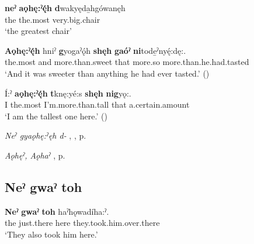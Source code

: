 \ea
\label{ex:npar11}
\gll \textbf{neˀ} \textbf{aǫhę:ˀę́h} \textbf{d}wakyęda̱hgówanęh\\
the the.most very.big.chair\\
\glt ‘the greatest chair’
\z

\ea
\label{ex:npar12}
\gll \textbf{Aǫhę:ˀę́h} hniˀ \textbf{g}yogaˀǫ́h \textbf{shęh} \textbf{gaóˀ} \textbf{ni}tode̱ˀnyę́:dę:.\\
the.most and more.than.sweet that more.so more.than.he.had.tasted\\
\glt ‘And it was sweeter than anything he had ever tasted.’ (\cite{carrier_legends_2013})
\z

\ea
\label{ex:npar13}
\gll Í:ˀ \textbf{aǫhę:ˀę́h} \textbf{t}knę:yé:s \textbf{shęh} \textbf{nig}yǫ:.\\
I the.most I’m.more.than.tall that a.certain.amount\\
\glt ‘I am the tallest one here.’ (\cite{carrier_legends_2013})
\z

\begin{CayugaRelated}
\item \textit{Neˀ gyaǫhę:ˀęh d-} , , p. \pageref{p:[neˀ gyaǫhę:ˀęh d-]}\\
\item \textit{Aǫhęˀ, Aǫhaˀ} , p. \pageref{p:[aǫhęˀ]}
\end{CayugaRelated}


\subsection*{\textbf{Neˀ gwaˀ toh} } \label{p:[neˀ gwaˀ toh]}

\ea
\label{ex:npar26}
\gll \textbf{Neˀ} \textbf{gwaˀ} \textbf{toh} haˀhǫwadíha:ˀ.\\
the just.there here they.took.him.over.there\\
\glt ‘They also took him here.’
\z

